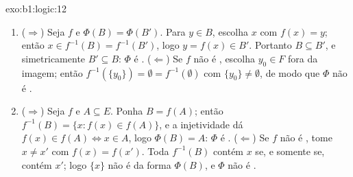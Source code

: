 \begin{solution}{exo:b1:logic:12}
\begin{enumerate}
  \item ($\Rightarrow$) Seja $f$  e $\Phi(B) =
        \Phi(B')$. Para $y \in B$, escolha $x$ com $f(x) = y$; então $x
        \in f^{-1}(B) = f^{-1}(B')$, logo $y = f(x) \in B'$. Portanto $B
        \subseteq B'$, e simetricamente $B' \subseteq B$: $\Phi$ é
        . ($\Leftarrow$) Se $f$ não é , escolha $y_0
        \in F$ fora da imagem; então $f^{-1}(\{y_0\}) = \emptyset =
        f^{-1}(\emptyset)$ com $\{y_0\} \neq \emptyset$, de modo que $\Phi$ não
        é .
  \item ($\Rightarrow$) Seja $f$  e $A \subseteq E$. Ponha
        $B = f(A)$; então $f^{-1}(B) = \{x : f(x) \in f(A)\}$, e a
        injetividade dá $f(x) \in f(A) \iff x \in A$, logo $\Phi(B) =
        A$: $\Phi$ é . ($\Leftarrow$) Se $f$ não é
        , tome $x \neq x'$ com $f(x) = f(x')$. Toda
         $f^{-1}(B)$ contém $x$ se, e somente se, contém
        $x'$; logo $\{x\}$ não é da forma $\Phi(B)$, e
        $\Phi$ não é .
\end{enumerate}
\end{solution}

